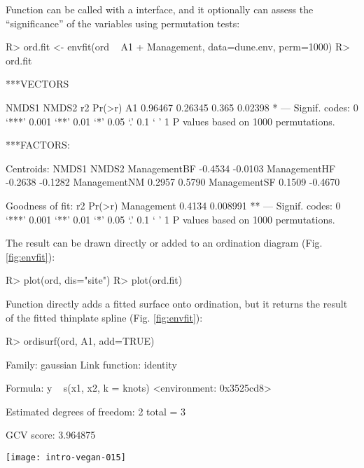 \documentclass[article,nojss]{jss}
\begin{document}
Function  can be called with a 
interface, and it optionally can assess the ``significance'' of the
variables using permutation tests:
\begin{Schunk}
\begin{Sinput}
R> ord.fit <- envfit(ord ~ A1 + Management, data=dune.env, perm=1000)
R> ord.fit
\end{Sinput}
\begin{Soutput}
***VECTORS

     NMDS1   NMDS2    r2  Pr(>r)  
A1 0.96467 0.26345 0.365 0.02398 *
---
Signif. codes:  0 ‘***’ 0.001 ‘**’ 0.01 ‘*’ 0.05 ‘.’ 0.1 ‘ ’ 1 
P values based on 1000 permutations.

***FACTORS:

Centroids:
               NMDS1   NMDS2
ManagementBF -0.4534 -0.0103
ManagementHF -0.2638 -0.1282
ManagementNM  0.2957  0.5790
ManagementSF  0.1509 -0.4670

Goodness of fit:
               r2   Pr(>r)   
Management 0.4134 0.008991 **
---
Signif. codes:  0 ‘***’ 0.001 ‘**’ 0.01 ‘*’ 0.05 ‘.’ 0.1 ‘ ’ 1 
P values based on 1000 permutations.
\end{Soutput}
\end{Schunk}
The result can be drawn directly or added to an ordination diagram
(Fig. \ref{fig:envfit}):
\begin{Schunk}
\begin{Sinput}
R> plot(ord, dis="site")
R> plot(ord.fit)
\end{Sinput}
\end{Schunk}

Function  directly adds a fitted surface onto
ordination, but it returns the result of the fitted thinplate spline
 (Fig. \ref{fig:envfit}):
\begin{Schunk}
\begin{Sinput}
R> ordisurf(ord, A1, add=TRUE)
\end{Sinput}
\begin{Soutput}
Family: gaussian 
Link function: identity 

Formula:
y ~ s(x1, x2, k = knots)
<environment: 0x3525cd8>

Estimated degrees of freedom:
2  total = 3 

GCV score: 3.964875
\end{Soutput}
\end{Schunk}
\begin{SCfigure}
\texttt{[image: intro-vegan-015]}
\caption{Fitted vector and smooth surface for the thickness of A1
  horizon (, in cm), and centroids of Management levels.}
\label{fig:envfit}
\end{SCfigure}
\end{document}

